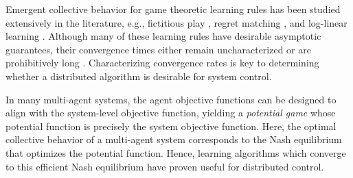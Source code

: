
\label{ch2}



Emergent collective behavior for game theoretic learning rules has been studied extensively in the literature, e.g., fictitious play \cite{fp1,fp2,jsfp}, regret matching \cite{Hart2000}, and log-linear learning \cite{Alos-Ferrer2010, Blume1993, Shah2010}.  Although many of these learning rules have desirable asymptotic guarantees, their convergence times either remain uncharacterized or are prohibitively long \cite{Ellison2000, Kandori1993,Shah2010,Hart2010}. Characterizing convergence rates is key to determining whether a distributed algorithm is desirable for system control.

In many multi-agent systems, the agent objective functions can be designed to align with the system-level objective function, yielding  a {\it potential game} \cite{Monderer1996} whose potential function is precisely the system objective function.  Here, the optimal collective behavior of a multi-agent system corresponds to the Nash equilibrium that optimizes the potential function. Hence, learning algorithms which converge to this efficient Nash equilibrium have proven useful for distributed control.


